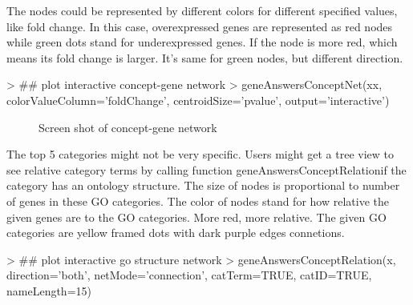 \documentclass[a4paper]{article}
\begin{document}
The nodes could be represented by different colors for different specified values, like fold change. In this case, overexpressed genes are represented as red nodes while green dots stand for underexpressed genes. If the node is more red, which means its fold change is larger. It's same for green nodes, but different direction. 
\begin{Schunk}
\begin{Sinput}
> ## plot interactive concept-gene network
> geneAnswersConceptNet(xx, colorValueColumn='foldChange', centroidSize='pvalue', output='interactive')
\end{Sinput}
\end{Schunk}

\begin{figure}
\centering
\centering
{}
\caption{Screen shot of concept-gene network}
\label{conceptgeneNetwork}
\end{figure}

The top 5 categories might not be very specific. Users might get a  tree view to see relative category terms by calling function geneAnswersConceptRelationif the category has an ontology structure. The size of nodes is proportional to number of genes in these GO categories. The color of nodes stand for how relative the given genes are to the GO categories. More red, more relative. The given GO categories are yellow framed dots with dark purple edges connetions.
\begin{Schunk}
\begin{Sinput}
> ## plot interactive go structure network
> geneAnswersConceptRelation(x, direction='both', netMode='connection', catTerm=TRUE, catID=TRUE, nameLength=15) 
\end{Sinput}
\end{Schunk}
\end{document}
